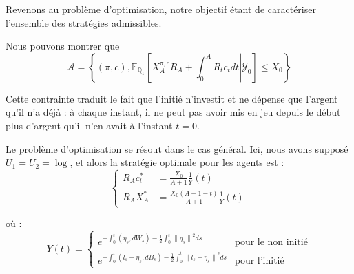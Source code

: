 \documentclass[../finalreport.tex]{subfiles}
\begin{document}
\par Revenons au problème d'optimisation, notre objectif étant de caractériser l'ensemble des stratégies admissibles.

\par Nous pouvons montrer que 
\begin{displaymath}
\mathcal{A} = \left\lbrace \left( \pi, c \right), \mathbb{E}_{\mathbb{Q}_1} \left[ X_A^{\pi, c} R_A + \int_0^A R_t c_t dt \left\vert\right. \mathcal{Y}_0 \right] \leq X_0 \right\rbrace
\end{displaymath}

\par Cette contrainte traduit le fait que l'initié n'investit et ne dépense que l'argent qu'il n'a déjà : à chaque instant, il ne peut pas avoir mis en jeu depuis le début plus d'argent qu'il n'en avait à l'instant $t = 0$.
\\

\par Le problème d'optimisation se résout dans le cas général. Ici, nous avons supposé $U_1 = U_2 = \log$, et alors la stratégie optimale pour les agents est :
\begin{displaymath}
\begin{cases}
R_A c_t^* &= \frac{X_0}{A + 1} \frac{1}{Y} \left( t \right) \\
R_A X_A^* &= \frac{X_0 \left( A + 1 - t \right)}{A + 1} \frac{1}{Y} \left( t \right)
\end{cases}
\end{displaymath}

\par où : 
\begin{displaymath}
Y \left( t \right) = 
\begin{cases}
e^{- \int_{0}^{t} \left( \eta_s, dW_{s} \right)-\frac{1}{2} \int_{0}^{t} {\| \eta_s \|}^{2} ds} & \text{pour le non initié} \\
e^{- \int_{0}^{t} \left( l_{s} + \eta_s, dB_{s} \right) - \frac{1}{2} \int_{0}^{t} {\| l_{s} + \eta_s \|}^{2} ds} & \text{pour l'initié}
\end{cases}
\end{displaymath}
\end{document}

